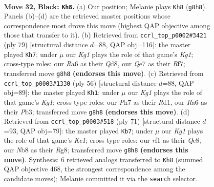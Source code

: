 \documentclass[11pt]{article}
\begin{document}
\clearpage

\begin{figure}[p]\centering
\begin{subfigure}{0.46\textwidth}\centering
\resizebox{\linewidth}{!}{%
\newchessgame
\chessboard[
  setfen={1n3rk1/2pnq2p/rp2p1p1/p3Pp2/P2P1P1P/1RP3N1/2K3PQ/4NR2 b - - 6 32},
  showmover=false,
  pgfstyle=straightmove, color=movearrow, markmove={g8-h8}
]}
\caption{}
\end{subfigure}\hfill
\begin{subfigure}{0.46\textwidth}\centering
\resizebox{\linewidth}{!}{%
\newchessgame
\chessboard[
  setfen={3q1rk1/R1p1nrp1/1p1pp2p/1Pn1p2P/2P1P1NN/3P2P1/R4PK1/3Q4 b - - 4 40},
  showmover=false,
  pgfstyle=straightmove, color=movearrow, markmove={g8-h7}
]}
\caption{}
\end{subfigure}
\\[4pt]
\begin{subfigure}{0.46\textwidth}\centering
\resizebox{\linewidth}{!}{%
\newchessgame
\chessboard[
  setfen={2r5/2qr1ppk/pp1ppnnp/8/2P1P3/1PNRQN1P/P4PP1/3R2K1 w - - 2 29},
  showmover=false,
  pgfstyle=straightmove, color=movearrow, markmove={g1-h1}
]}
\caption{}
\end{subfigure}\hfill
\begin{subfigure}{0.46\textwidth}\centering
\resizebox{\linewidth}{!}{%
\newchessgame
\chessboard[
  setfen={2k1q1r1/2nr1npp/p3p3/Pp1pPp1P/1BpP1N1Q/2P3R1/2P2PP1/2K4R b - - 37 36},
  showmover=false,
  pgfstyle=straightmove, color=movearrow, markmove={c8-b7}
]}
\caption{}
\end{subfigure}
\caption{\textbf{Move 32, Black: \texttt{Kh8}.} (a) Our position; Melanie plays \texttt{Kh8} (\texttt{g8h8}). Panels (b)--(d) are the retrieved master positions whose correspondence most drove this move (highest QAP objective among those that transfer to it). (b) Retrieved from \texttt{ccrl\_top\_p0002\#3421} (ply 79) [structural distance $d$=88, QAP obj=116]: the master played \texttt{Kh7}; under $\mu$ our \emph{Kg1} plays the role of that game's \emph{Kg1}; cross-type roles: our \emph{R}a6 as their \emph{Q}d8, our \emph{Q}e7 as their \emph{R}f7; transferred move \texttt{g8h8} \textbf{(endorses this move)}. (c) Retrieved from \texttt{ccrl\_top\_p0003\#1330} (ply 56) [structural distance $d$=88, QAP obj=89]: the master played \texttt{Kh1}; under $\mu$ our \emph{Kg1} plays the role of that game's \emph{Kg1}; cross-type roles: our \emph{P}h7 as their \emph{R}d1, our \emph{R}a6 as their \emph{P}b3; transferred move \texttt{g8h8} \textbf{(endorses this move)}. (d) Retrieved from \texttt{ccrl\_top\_p0003\#518} (ply 71) [structural distance $d$=93, QAP obj=79]: the master played \texttt{Kb7}; under $\mu$ our \emph{Kg1} plays the role of that game's \emph{Kc1}; cross-type roles: our \emph{r}f1 as their \emph{Q}e8, our \emph{N}b8 as their \emph{R}g8; transferred move \texttt{g8h8} \textbf{(endorses this move)}. Synthesis: 6 retrieved analogs transferred to \texttt{Kh8} (summed QAP objective 468, the strongest correspondence among the candidate moves); Melanie committed it via the \texttt{search} selector.}
\label{fig:thought-m63}
\end{figure}
\end{document}
